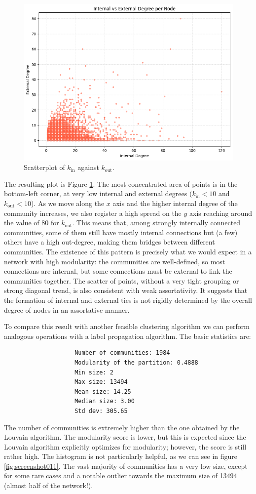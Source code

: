 \documentclass[12pt]{article}
\begin{document}
\begin{figure}[h]
	\centering
	\includegraphics[width=0.6\linewidth]{screenshot010}
	\caption{Scatterplot of $k_{\mathrm{in}}$ against $k_{\mathrm{out}}$.}
	\label{fig:screenshot010}
\end{figure}
The resulting plot is Figure \ref{fig:screenshot010}. The most concentrated area of points is in the bottom-left corner, at very low internal and external degrees ($k_{\mathrm{in}}<10$ and $k_{\mathrm{out}}<10$). As we move along the $x$ axis and the higher internal degree of the community increases, we also register a high spread on the $y$ axis reaching around the value of 80 for $k_{\mathrm{out}}$. This means that, among strongly internally connected communities, some of them still have mostly internal connections but (a few) others have a high out-degree, making them bridges between different communities.  The existence of this pattern is precisely what we would expect in a network with high modularity: the communities are well-defined, so most connections are internal, but some connections must be external to link the communities together.  The scatter of points, without a very tight grouping or strong diagonal trend, is also consistent with weak assortativity. It suggests that the formation of internal and external ties is not rigidly determined by the overall degree of nodes in an assortative manner.\par
To compare this result with another feasible clustering algorithm we can perform analogous operations with a label propagation algorithm. The basic statistics are:
\begin{center}
	\begin{verbatim}
					Number of communities: 1984
					Modularity of the partition: 0.4888
					Min size: 2
					Max size: 13494
					Mean size: 14.25
					Median size: 3.00
					Std dev: 305.65
	\end{verbatim}
\end{center}
The number of communities is extremely higher than the one obtained by the Louvain algorithm. The modularity score is lower, but this is expected since the Louvain algorithm explicitly optimizes for modularity; however, the score is still rather high. The histogram is not particularly helpful, as we can see in figure \ref{fig:screenshot011}. The vast majority of communities has a very low size, except for some rare cases and a notable outlier towards the maximum size of 13494 (almost half of the network!).
\end{document}
